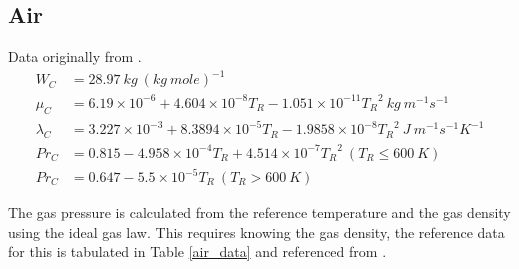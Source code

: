 \documentclass[../Interim_Report_Master]{subfiles}
\begin{document}
\subsection{Air}
Data originally from \cite{harpole1981}.
\begin{subequations}
\begin{align}
W_C &= 28.97~kg~(kg~mole)^{-1} \\
\mu_C &= 6.19\times 10^{-6} + 4.604\times 10^{-8}T_R - 1.051\times 10^{-11}{T_R}^2~kg~m^{-1}s^{-1} \\
\lambda_C &= 3.227\times 10^{-3} + 8.3894\times 10^{-5}T_R - 1.9858\times 10^{-8}{T_R}^2~J~m^{-1}s^{-1}K^{-1} \\
Pr_C &= 0.815 - 4.958\times 10^{-4}T_R + 4.514\times 10^{-7}{T_R}^2~(T_R\leq 600~K) \\
Pr_C &= 0.647 - 5.5\times 10^{-5}T_R~(T_R>600~K) 
\end{align}
\end{subequations}

The gas pressure is calculated from the reference temperature and the gas density using the ideal gas law. This requires knowing the gas density, the reference data for this is tabulated in Table \ref{air_data} and referenced from \cite{cengel2008}.
\end{document}
